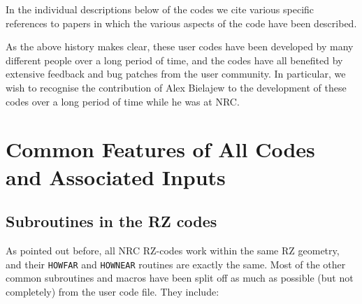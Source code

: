 \documentclass[12pt,twoside]{article}  %
\begin{document}
In the individual descriptions below of the codes we cite various specific
references to papers in which the various aspects of the code have been
described.

As the above history makes clear, these user codes have been developed
by many different people over a long period of time, and the codes
have all benefited by extensive feedback and bug patches from the user
community. In particular, we wish to recognise the contribution of Alex
Bielajew to the development of these codes over a long period of time
while he was at NRC.

\renewcommand{\leftmark}{{COMMON FEATURES}}
\section[Common Features]{Common Features of All Codes and Associated Inputs}
\label{Common}
\subsection{Subroutines in the RZ codes}

As pointed out before, all NRC RZ-codes work within the same RZ
geometry, and their \verb+HOWFAR+ and \verb+HOWNEAR+ routines are
exactly the same. Most of the other common subroutines and macros
have been split off as much as possible (but not completely)
from the user code file. They include:
\end{document}
